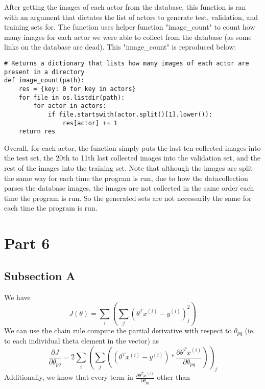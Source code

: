 \documentclass[11pt,a4paper]{report}
\begin{document}
After getting the images of each actor from the database, this function is ran with an argument that dictates the list of actors to generate test, validation, and training sets for. The function uses helper function "image\_count" to count how many images for each actor we were able to collect from the database (as some links on the database are dead). This "image\_count" is reproduced below:

\begin{lstlisting}
# Returns a dictionary that lists how many images of each actor are present in a directory
def image_count(path):
    res = {key: 0 for key in actors}
    for file in os.listdir(path):
        for actor in actors:
            if file.startswith(actor.split()[1].lower()):
                res[actor] += 1
    return res
\end{lstlisting}

Overall, for each actor, the function simply puts the last ten collected images into the test set, the 20th to 11th last collected images into the validation set, and the rest of the images into the training set. Note that although the images are split the same way for each time the program is run, due to how the datacollection parses the database images, the images are not collected in the same order each time the program is run. So the generated sets are not necessarily the same for each time the program is run.

\section*{Part 6}
\subsection*{Subsection A}
We have 
\begin{equation}
J(\theta)=\sum_i(\sum_j(\theta^T x^{(i)} - y^{(i)})^2_j)
\end{equation}
We can use the chain rule compute the partial derivative with respect to $\theta_{pq}$ (ie. to each individual theta element in the vector) as
\begin{equation}
\frac{\partial J}{\partial \theta_{pq}} = 2 \sum_i(\sum_j((\theta^T x^{(i)} - y^{(i)})*\frac{\partial \theta^T x^{(i)}}{\partial \theta_{pq}}))_j
\end{equation} 
Additionally, we know that every term in $\frac{\partial \theta^T x^{(i)}}{\partial \theta_{pq}}$ other than
\end{document}
